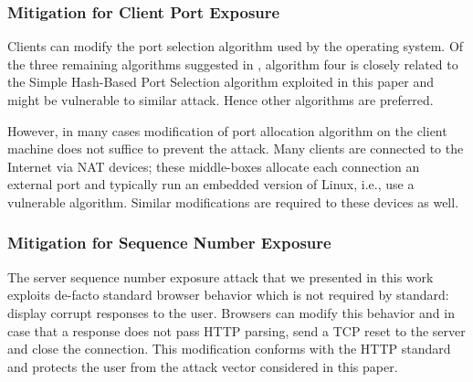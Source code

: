 \documentclass[conference]{IEEEtran}
\newcommand{\ignore}[1]{}
\begin{document}
\subsubsection{Mitigation for Client Port Exposure}
Clients can modify the port selection algorithm used by the operating system. Of the three remaining algorithms suggested in \cite{rfc6056}, algorithm four is closely related to the Simple Hash-Based Port Selection algorithm exploited in this paper and might be vulnerable to similar attack. Hence other algorithms are preferred. 

However, in many cases modification of port allocation algorithm on the client machine does not suffice to prevent the attack. Many clients are connected to the Internet via NAT devices; these middle-boxes allocate each connection an external port and typically run an embedded version of Linux, i.e., use a vulnerable algorithm. Similar modifications are required to these devices as well. 


\subsubsection{Mitigation for Sequence Number Exposure}
The server sequence number exposure attack that we presented in this work exploits de-facto standard browser behavior which is not required by standard: display corrupt responses to the user. Browsers can modify this behavior and in case that a response does not pass HTTP parsing, send a TCP reset to the server and close the connection. This modification conforms with the HTTP standard and protects the user from the attack vector considered in this paper. 



\ignore{as for the current version of Linux, there is no easily configurable alternate algorithm implemented in the system. Furthermore, in many cases,}
\end{document}
